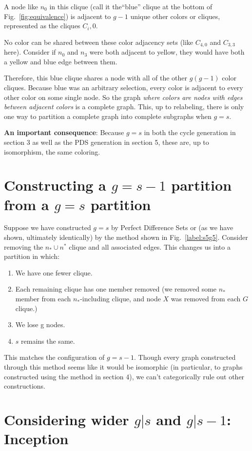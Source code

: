 \documentclass[11pt, oneside]{article} 	%
\begin{document}
A node like $n_0$ in this clique (call it the``blue'' clique at the bottom of Fig.~\ref{fig:equivalence}) is adjacent to $g-1$ unique other colors or cliques, represented as the cliques $C_i,0$.

No color can be shared between these color adjacency sets (like $C_{4,0}$ and $C_{3,3}$ here). Consider if $n_0$ and $n_3$ were both adjacent to yellow, they would have both a yellow and blue edge between them.

Therefore, this blue clique shares a node with all of the other $g(g-1)$ color cliques. Because blue was an arbitrary selection, every color is adjacent to every other color on some single node.
So the graph \emph{where colors are nodes with edges between adjacent colors} is a complete graph. This, up to relabeling, there is only one way to partition a complete graph into complete subgraphs when $g=s$.

\textbf{An important consequence}: Because $g=s$ in both the cycle generation in section 3 as well as the PDS generation in section 5, these are, up to isomorphism, the same coloring.

\section{Constructing a $g=s-1$ partition from a $g=s$ partition}

Suppose we have constructed $g=s$ by Perfect Difference Sets or (as we have shown, ultimately identically) by the method shown in Fig.~\ref{label:s5g5}. Consider removing the $n_* \cup n^*$ clique and all associated edges. This changes us into a partition in which:
 
\begin{enumerate}
\item We have one fewer clique.
\item Each remaining clique has one member removed (we removed some $n_*$ member from each $n_*$-including clique, and node $X$ was removed from each $G$ clique.)
\item We lose g nodes.
\item $s$ remains the same.
\end{enumerate}

This matches the configuration of $g=s-1$. Though every graph constructed through this method seems like it would be isomorphic (in particular, to graphs constructed using the method in section 4), we can't categorically rule out other constructions. 

\section{Considering wider $g | s$ and $g | s-1$: Inception}
\end{document}
